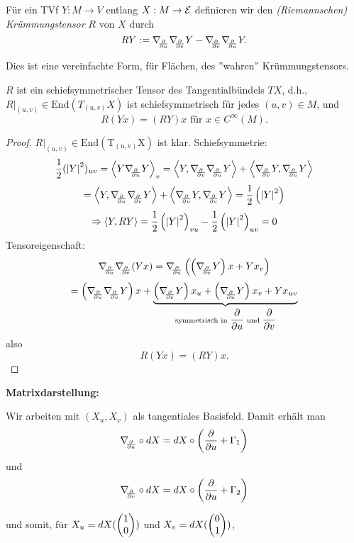 \begin{definition}
	
	Für ein TVf $ Y : M \rightarrow V $ entlang $ X: M \rightarrow \mathcal E $ definieren wir den \emph{(Riemannschen) Krümmungstensor} $ R $ von $X$ durch 
		\[ RY := \D{u}\D vY - \D v\D{u}Y. \]
	
\end{definition}

\begin{remark}
	
	Dies ist eine vereinfachte Form, für Flächen, des ''wahren'' Krümmungstensors.
	
\end{remark}

\begin{lemma}
	
	$ R $ ist ein schiefsymmetrischer Tensor des Tangentialbündels $ TX $, d.h., 
	$R\big|_{(u,v)} \in \mathrm{End}(T_{(u,v)}X) $ ist schiefsymmetrisch für jedes $ (u,v) \in M $, und 
		\[ R(Yx) = (RY)x \text{ für } x \in C^\infty(M). \]
	
\end{lemma}

\begin{proof}
	
	$R\big|_{(u,v)} \in \mathrm{End(T_{(u,v)}X)}$ ist klar.
	Schiefsymmetrie:
		\[\frac12 (\abs{Y}^2)_{uv} = \skal{Y \D{u}Y}_v = \skal{Y, \D v\D{u}Y} + \skal{\D vY,\D{u}Y} \]
		\[ = \skal{Y, \D{u}\D vY} + \skal{\D{u}Y, \D vY} = \frac12 \left( \abs{Y}^2\right)  \]
		\[ \Rightarrow \left \langle Y,RY \right\rangle = \frac12 \left(\left| Y\right|^2\right)_{vu}- \frac12\left(\left| Y\right|^2\right)_{uv}=0 \]
	Tensoreigenschaft:
		\[ \D{u}\D v(Yx)= \D{u}\left(\left( \D vY \right)x + Yx_v\right) \]
		\[ = \left( \D{u} \D v Y \right)x + \underbrace{\left( \D vY \right)x_u + \left( \D{u}Y \right)x_v + Yx_{uv}}_{\text{symmetrisch in } \dfrac{\partial}{\partial u} \text{ und } \dfrac{\partial}{\partial v}} \]
	also
		\[ R(Yx)=(RY)x. \]
	
\end{proof}

\textbf{Matrixdarstellung:}
	
	Wir arbeiten mit $ (X_u,X_v) $ als tangentiales Basisfeld. Damit erhält man
		\[ \nabla_{\!\!{\partial\over \partial u}} \circ dX = dX \circ \left( \dfrac{\partial}{\partial u} + \Gamma_{1} \right) \] 
	und 
		\[ \nabla_{\!\!{\partial\over \partial v}}  \circ dX = dX \circ \left( \dfrac{\partial}{\partial u} + \Gamma_{2}\right) \]
		
	und somit, für $ X_u = dX(\begin{pmatrix} 1 \\ 0 \end{pmatrix}) $ und $ X_v = dX(\begin{pmatrix} 0 \\ 1 \end{pmatrix}) $,
	
